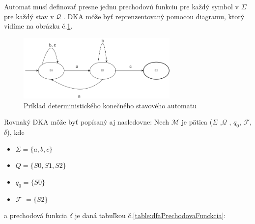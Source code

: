 Automat musí definovať presne jednu prechodovú funkciu pre každý symbol v $\Sigma$ pre každý stav v $\mathcal{Q}$ \cite{FiniteStateMachines}.
DKA môže byť reprenzentovaný pomocou diagramu, ktorý vidíme na obrázku č.\ref{figure:dfa1}.

\newpage

\begin{figure}[!h]
    \centering
    \includegraphics[width=0.70\textwidth]{img/dfa.png}
    \caption{Príklad deterministického konečného stavového automatu}
    \label{figure:dfa1}
\end{figure}

Rovnaký DKA môže byť popísaný aj nasledovne:
Nech $\mathcal{M}$ je pätica ($\Sigma$ ,$\mathcal{Q}$ , $q_0$, $\mathcal{F}$, $\delta$), kde
\begin{itemize}
    \item \begin{math} \Sigma = \{a, b ,c \}  \end{math}
    \item \begin{math} Q = \{S0, S1, S2 \}  \end{math}
    \item \begin{math} q_0 = \{S0 \}  \end{math}
    \item $\mathcal{F}$ \begin{math} = \{S2\}  \end{math}
\end{itemize}
a prechodová funkcia $\delta$ je daná tabuľkou č.\ref{table:dfaPrechodovaFunckcia}:

